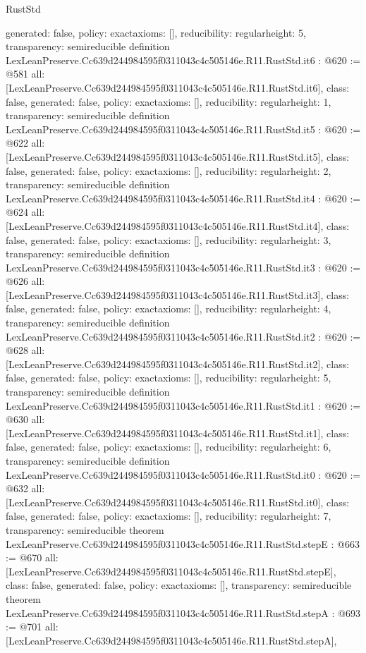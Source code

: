 \begin{lexlean}{RustStd}
\begin{coremodule}
{  generated: false,
  policy: exact{axioms: []},
  reducibility: regular{height: 5},
  transparency: semireducible
}
definition LexLeanPreserve.Cc639d244984595f0311043c4c505146e.R11.RustStd.it6 : @620 := @581 {
  all: [LexLeanPreserve.Cc639d244984595f0311043c4c505146e.R11.RustStd.it6],
  class: false,
  generated: false,
  policy: exact{axioms: []},
  reducibility: regular{height: 1},
  transparency: semireducible
}
definition LexLeanPreserve.Cc639d244984595f0311043c4c505146e.R11.RustStd.it5 : @620 := @622 {
  all: [LexLeanPreserve.Cc639d244984595f0311043c4c505146e.R11.RustStd.it5],
  class: false,
  generated: false,
  policy: exact{axioms: []},
  reducibility: regular{height: 2},
  transparency: semireducible
}
definition LexLeanPreserve.Cc639d244984595f0311043c4c505146e.R11.RustStd.it4 : @620 := @624 {
  all: [LexLeanPreserve.Cc639d244984595f0311043c4c505146e.R11.RustStd.it4],
  class: false,
  generated: false,
  policy: exact{axioms: []},
  reducibility: regular{height: 3},
  transparency: semireducible
}
definition LexLeanPreserve.Cc639d244984595f0311043c4c505146e.R11.RustStd.it3 : @620 := @626 {
  all: [LexLeanPreserve.Cc639d244984595f0311043c4c505146e.R11.RustStd.it3],
  class: false,
  generated: false,
  policy: exact{axioms: []},
  reducibility: regular{height: 4},
  transparency: semireducible
}
definition LexLeanPreserve.Cc639d244984595f0311043c4c505146e.R11.RustStd.it2 : @620 := @628 {
  all: [LexLeanPreserve.Cc639d244984595f0311043c4c505146e.R11.RustStd.it2],
  class: false,
  generated: false,
  policy: exact{axioms: []},
  reducibility: regular{height: 5},
  transparency: semireducible
}
definition LexLeanPreserve.Cc639d244984595f0311043c4c505146e.R11.RustStd.it1 : @620 := @630 {
  all: [LexLeanPreserve.Cc639d244984595f0311043c4c505146e.R11.RustStd.it1],
  class: false,
  generated: false,
  policy: exact{axioms: []},
  reducibility: regular{height: 6},
  transparency: semireducible
}
definition LexLeanPreserve.Cc639d244984595f0311043c4c505146e.R11.RustStd.it0 : @620 := @632 {
  all: [LexLeanPreserve.Cc639d244984595f0311043c4c505146e.R11.RustStd.it0],
  class: false,
  generated: false,
  policy: exact{axioms: []},
  reducibility: regular{height: 7},
  transparency: semireducible
}
theorem LexLeanPreserve.Cc639d244984595f0311043c4c505146e.R11.RustStd.stepE : @663 := @670 {
  all: [LexLeanPreserve.Cc639d244984595f0311043c4c505146e.R11.RustStd.stepE],
  class: false,
  generated: false,
  policy: exact{axioms: []},
  transparency: semireducible
}
theorem LexLeanPreserve.Cc639d244984595f0311043c4c505146e.R11.RustStd.stepA : @693 := @701 {
  all: [LexLeanPreserve.Cc639d244984595f0311043c4c505146e.R11.RustStd.stepA],
}
\end{coremodule}
\end{lexlean}
